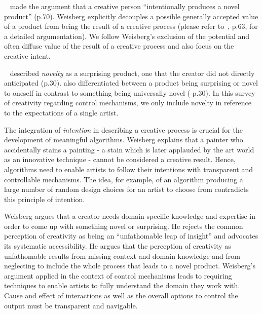 
\citeauthor*{weisberg_2006_cui}~\cite{weisberg_2006_cui} made the argument that a creative person ``intentionally produces a novel product'' (p.70). Weisberg explicitly decouples a possible generally accepted value of a product from being the result of a creative process (please refer to~\cite{weisberg_2006_cui}, p.63, for a detailed argumentation). We follow Weisberg's exclusion of the potential and often diffuse value of the result of a creative process and also focus on the creative intent. 

\citeauthor*{boden_2010_cat}~\cite{boden_2010_cat} described \textit{novelty} as a surprising product, one that the creator did not directly anticipated (p.30). \citeauthor*{boden_2010_cat} also differentiated between a product being surprising or novel to oneself in contrast to something being universally novel (\cite{boden_2010_cat} p.30). In this survey of creativity regarding control mechanisms, we only include novelty in reference to the expectations of a single artist.

The integration of \textit{intention} in describing a creative process is crucial for the development of meaningful algorithms. Weisberg explains that a painter who accidentally stains a painting - a stain which is later applauded by the art world as an innovative technique - cannot be considered a creative result. Hence, algorithms need to enable artists to follow their intentions with transparent and controllable mechanisms. The idea, for example, of an algorithm producing a large number of random design choices for an artist to choose from contradicts this principle of intention.


Weisberg argues that a creator needs domain-specific knowledge and expertise in order to come up with something novel or surprising. 
He rejects the common perception of creativity as being an ``unfathomable leap of insight'' and advocates its systematic accessibility. He argues that the perception of creativity as unfathomable results from missing context and domain knowledge and from neglecting to include the whole process that leads to a novel product. Weisberg's argument applied in the context of control mechanisms leads to requiring techniques to enable artists to fully understand the domain they work with. Cause and effect of interactions as well as the overall options to control the output must be transparent and navigable.

